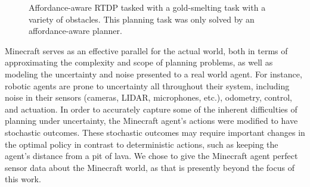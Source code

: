 \documentclass[conference]{IEEEtran}
\begin{document}
\begin{figure}
\centering
{}%
%
%
%
  \caption{Affordance-aware RTDP tasked with a gold-smelting task with a variety of obstacles. This planning task was
  only solved by an affordance-aware planner.}
  \label{fig:epicworld}
\end{figure}

Minecraft serves as an effective parallel for the actual world, both
in terms of approximating the complexity and scope of planning
problems, as well as modeling the uncertainty and noise presented to a
real world agent.  For instance, robotic agents are prone to
uncertainty all throughout their system, including noise in their
sensors (cameras, LIDAR, microphones, etc.), odometry, control, and
actuation.  In order to accurately capture some of the inherent
difficulties of planning under uncertainty, the Minecraft agent's
actions were modified to have stochastic outcomes. These stochastic
outcomes may require important changes in the optimal policy in
contrast to deterministic actions, such as keeping the agent's
distance from a pit of lava. We chose to give the Minecraft agent perfect
sensor data about the Minecraft world, as that is presently beyond the focus of this
work.
\end{document}
